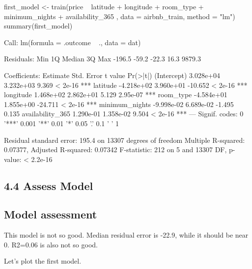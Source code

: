 \begin{Schunk}
\begin{Sinput}
first_model <- train(price ~ latitude + longitude + room_type + minimum_nights  + availability_365 , data = airbnb_train, method = "lm")
summary(first_model)
\end{Sinput}
\begin{Soutput}

Call:
lm(formula = .outcome ~ ., data = dat)

Residuals:
   Min     1Q Median     3Q    Max 
-196.5  -59.2  -22.3   16.3 9879.3 

Coefficients:
                   Estimate Std. Error t value Pr(>|t|)    
(Intercept)       3.028e+04  3.232e+03   9.369  < 2e-16 ***
latitude         -4.218e+02  3.960e+01 -10.652  < 2e-16 ***
longitude         1.468e+02  2.862e+01   5.129 2.95e-07 ***
room_type        -4.584e+01  1.855e+00 -24.711  < 2e-16 ***
minimum_nights   -9.998e-02  6.689e-02  -1.495    0.135    
availability_365  1.290e-01  1.358e-02   9.504  < 2e-16 ***
---
Signif. codes:  0 '***' 0.001 '**' 0.01 '*' 0.05 '.' 0.1 ' ' 1

Residual standard error: 195.4 on 13307 degrees of freedom
Multiple R-squared:  0.07377,   Adjusted R-squared:  0.07342 
F-statistic:   212 on 5 and 13307 DF,  p-value: < 2.2e-16
\end{Soutput}
\end{Schunk}

\hypertarget{assess-model}{%
\subsection{4.4 Assess Model}\label{assess-model}}

\hypertarget{model-assessment}{%
\subsection{Model assessment}\label{model-assessment}}

This model is not so good. Median residual error is -22.9, while it
should be near 0. R2=0.06 is also not so good.

Let's plot the first model.

